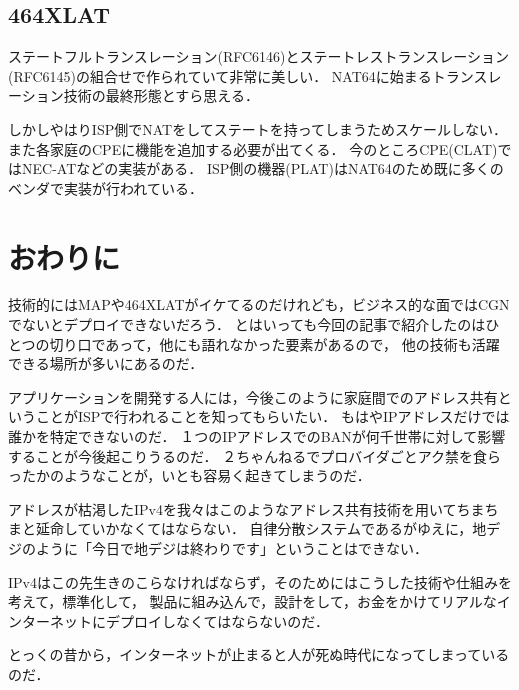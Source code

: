 \subsection{464XLAT}
ステートフルトランスレーション(RFC6146)とステートレストランスレーション(RFC6145)の組合せで作られていて非常に美しい．
NAT64に始まるトランスレーション技術の最終形態とすら思える．

しかしやはりISP側でNATをしてステートを持ってしまうためスケールしない．
また各家庭のCPEに機能を追加する必要が出てくる．
今のところCPE(CLAT)ではNEC-ATなどの実装がある．
ISP側の機器(PLAT)はNAT64のため既に多くのベンダで実装が行われている．

\section{おわりに}

技術的にはMAPや464XLATがイケてるのだけれども，ビジネス的な面ではCGNでないとデプロイできないだろう．
とはいっても今回の記事で紹介したのはひとつの切り口であって，他にも語れなかった要素があるので，
他の技術も活躍できる場所が多いにあるのだ．

アプリケーションを開発する人には，今後このように家庭間でのアドレス共有ということがISPで行われることを知ってもらいたい．
もはやIPアドレスだけでは誰かを特定できないのだ．
１つのIPアドレスでのBANが何千世帯に対して影響することが今後起こりうるのだ．
２ちゃんねるでプロバイダごとアク禁を食らったかのようなことが，いとも容易く起きてしまうのだ．

アドレスが枯渇したIPv4を我々はこのようなアドレス共有技術を用いてちまちまと延命していかなくてはならない．
自律分散システムであるがゆえに，地デジのように「今日で地デジは終わりです」ということはできない．

IPv4はこの先生きのこらなければならず，そのためにはこうした技術や仕組みを考えて，標準化して，
製品に組み込んで，設計をして，お金をかけてリアルなインターネットにデプロイしなくてはならないのだ．

とっくの昔から，インターネットが止まると人が死ぬ時代になってしまっているのだ．
